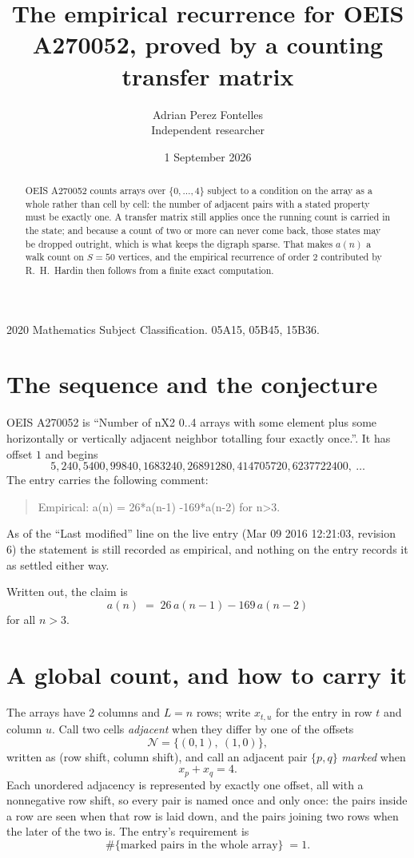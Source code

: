 \documentclass[11pt,a4paper]{article}
\title{The empirical recurrence for OEIS A270052, proved by a counting transfer matrix}
\author{Adrian Perez Fontelles\\ \small Independent researcher}
\date{1 September 2026}
\theoremstyle{plain}
\theoremstyle{definition}
\begin{document}
\maketitle

\begin{abstract}
OEIS A270052 counts arrays over $\{0,\dots,4\}$ subject to a condition on the array as a
whole rather than cell by cell: the number of adjacent pairs with a stated property must be
exactly one. A transfer matrix still applies once the running count is carried in the state; and
because a count of two or more can never come back, those states may be dropped outright,
which is what keeps the digraph sparse. That makes $a(n)$ a walk count on $S=50$ vertices,
and the empirical recurrence of order $2$ contributed by R.~H.~Hardin then follows from
a finite exact computation.
\end{abstract}

\noindent\small 2020 Mathematics Subject Classification. 05A15, 05B45, 15B36.\normalsize

\section{The sequence and the conjecture}

OEIS A270052 is ``Number of nX2 0..4 arrays with some element plus some horizontally or vertically adjacent neighbor totalling four exactly once.''. It has offset $1$ and begins
\[
5, 240, 5400, 99840, 1683240, 26891280, 414705720, 6237722400,\ \dots
\]
The entry carries the following comment:
\begin{quote}\small
Empirical: a(n) = 26*a(n-1) -169*a(n-2) for n>3.
\end{quote}
As of the ``Last modified'' line on the live entry (Mar 09 2016 12:21:03, revision 6) the statement is
still recorded as empirical, and nothing on the entry records it as settled either way.

Written out, the claim is
\begin{equation}\label{eq:conj}
a(n)\;=\;26\,a(n-1) - 169\,a(n-2)
\end{equation}
for all $n>3$.

\section{A global count, and how to carry it}

The arrays have $2$ columns and $L=n$ rows; write $x_{t,u}$ for the entry in
row $t$ and column $u$. Call two cells \emph{adjacent} when they differ by one of the
offsets
\[
\mathcal N=\{(0,1),\ (1,0)\},
\]
written as (row shift, column shift), and call an adjacent pair $\{p,q\}$
\emph{marked} when
\[
x_{p}+x_{q}=4 .
\]
Each unordered adjacency is represented by exactly one offset, all with a nonnegative row
shift, so every pair is named once and only once: the pairs inside a row are seen when
that row is laid down, and the pairs joining two rows when the later of the two is. The
entry's requirement is
\begin{equation}\label{eq:glob}
\#\{\text{marked pairs in the whole array}\}\;=1.
\end{equation}
\end{document}
